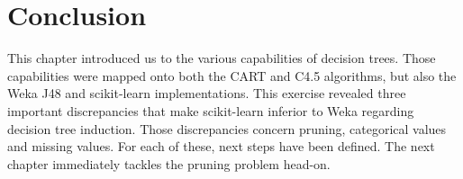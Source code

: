 
\section{Conclusion}
This chapter introduced us to the various capabilities of decision trees. Those capabilities were mapped onto both the CART and C4.5 algorithms, but also the Weka J48 and scikit-learn implementations. This exercise revealed three important discrepancies that make scikit-learn inferior to Weka regarding decision tree induction. Those discrepancies concern pruning, categorical values and missing values. For each of these, next steps have been defined. The next chapter immediately tackles the pruning problem head-on.
